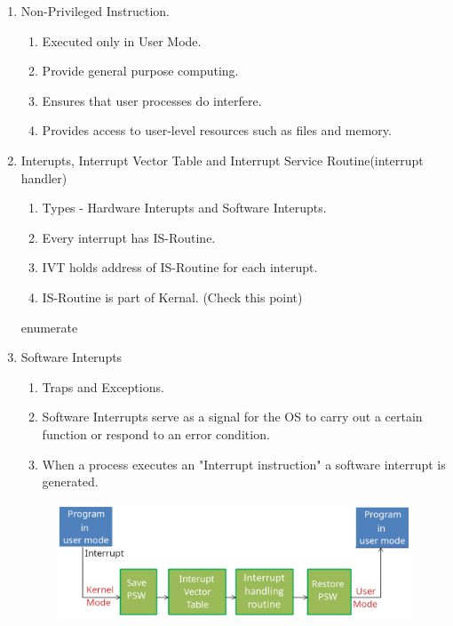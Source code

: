 \begin{enumerate}
  \item Non-Privileged Instruction.
  \begin{enumerate}
        \item Executed only in User Mode.
        \item Provide general purpose computing.
        \item Ensures that user processes do interfere.
        \item Provides access to user-level resources such as files and memory.
  \end{enumerate}


  \item Interupts, Interrupt Vector Table and Interrupt Service Routine(interrupt handler)
  \begin{enumerate}
        \item Types - Hardware Interupts and Software Interupts.
        \item Every interrupt has IS-Routine.
        \item IVT holds address of IS-Routine for each interupt.
        \item IS-Routine is part of Kernal. (Check this point)
  \end{enumerate}{enumerate}


  \item Software Interupts
  \begin{enumerate}
        \item Traps and Exceptions.
        \item Software Interrupts serve as a signal for the OS to carry out a certain function or respond to an error condition.
        \item When a process executes an "Interrupt instruction" a software interrupt is generated.
  \end{enumerate}

  \begin{figure}[h]
      \centering   \includegraphics[scale=1.6]{./images/Interupt_01.jpeg}
  \end{figure}


\end{enumerate}
